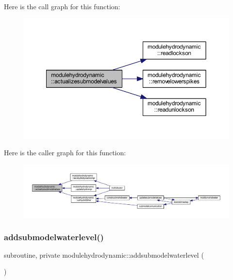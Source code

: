 Here is the call graph for this function\+:\nopagebreak
\begin{figure}[H]
\begin{center}
\leavevmode
\includegraphics[width=350pt]{namespacemodulehydrodynamic_a6c99419ab0bd5db0c25f899c10d86020_cgraph}
\end{center}
\end{figure}
Here is the caller graph for this function\+:\nopagebreak
\begin{figure}[H]
\begin{center}
\leavevmode
\includegraphics[width=350pt]{namespacemodulehydrodynamic_a6c99419ab0bd5db0c25f899c10d86020_icgraph}
\end{center}
\end{figure}
\mbox{\label{namespacemodulehydrodynamic_aab2200414765344d596b6ebaadc2fa4a}} 
\subsubsection{\texorpdfstring{addsubmodelwaterlevel()}{addsubmodelwaterlevel()}}
{\footnotesize\ttfamily subroutine, private modulehydrodynamic\+::addsubmodelwaterlevel (\begin{DoxyParamCaption}{ }\end{DoxyParamCaption})\hspace{0.3cm}{\ttfamily [private]}}

